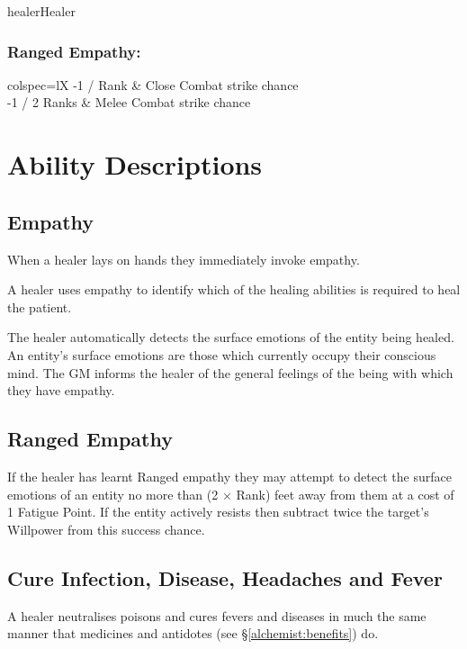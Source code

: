 \begin{Skill}[1.4]{healer}{Healer}
\subsubsection{Ranged Empathy:}

\begin{dqtblr}{colspec={lX}}
-1 / Rank	& Close Combat strike chance \\
-1 / 2 Ranks	& Melee Combat strike chance \\
\end{dqtblr}

\section{Ability Descriptions}

\subsection{Empathy}

When a healer lays on hands they immediately invoke empathy.

A healer uses empathy to identify which of the healing abilities is
required to heal the patient.

The healer automatically detects the surface emotions of the entity
being healed. An entity’s surface emotions are those which currently
occupy their conscious mind. The GM informs the healer of the general
feelings of the being with which they have empathy.

\subsection{Ranged Empathy}

If the healer has learnt Ranged empathy they may attempt to detect the
surface emotions of an entity no more than (2 × Rank) feet away from
them at a cost of 1 Fatigue Point. If the entity actively resists then
subtract twice the target’s Willpower from this success chance.

\subsection{Cure Infection, Disease, Headaches and Fever}

  A healer neutralises poisons and cures fevers and diseases
in much the same manner that medicines and antidotes (see
\S\ref{alchemist:benefits}) do.


\end{Skill}
